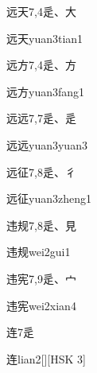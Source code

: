 \begin{entry}{远天}{7,4}{⾡、⼤}
  \begin{phonetics}{远天}{yuan3tian1}
  \end{phonetics}
\end{entry}

\begin{entry}{远方}{7,4}{⾡、⽅}
  \begin{phonetics}{远方}{yuan3fang1}
  \end{phonetics}
\end{entry}

\begin{entry}{远远}{7,7}{⾡、⾡}
  \begin{phonetics}{远远}{yuan3yuan3}
  \end{phonetics}
\end{entry}

\begin{entry}{远征}{7,8}{⾡、⼻}
  \begin{phonetics}{远征}{yuan3zheng1}
  \end{phonetics}
\end{entry}

\begin{entry}{违规}{7,8}{⾡、⾒}
  \begin{phonetics}{违规}{wei2gui1}
  \end{phonetics}
\end{entry}

\begin{entry}{违宪}{7,9}{⾡、⼧}
  \begin{phonetics}{违宪}{wei2xian4}
  \end{phonetics}
\end{entry}

\begin{entry}{连}{7}{⾡}
  \begin{phonetics}{连}{lian2}[][HSK 3]
  \end{phonetics}
\end{entry}

